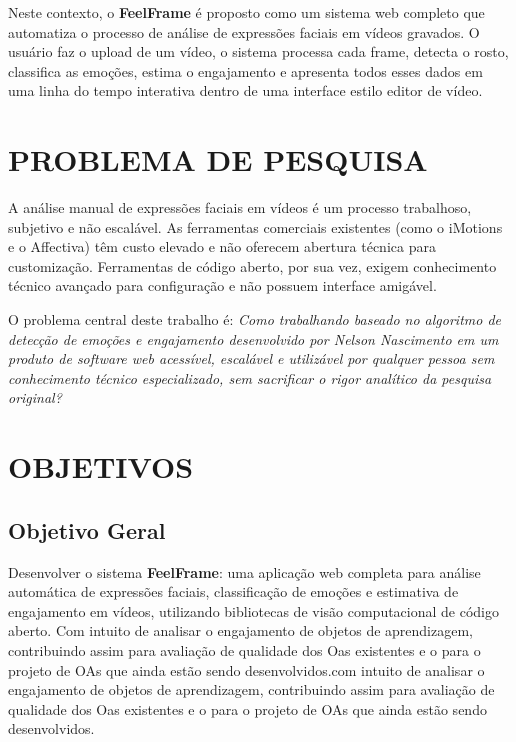 \documentclass[
	12pt,
	openright,
	oneside,
	a4paper,
	english,
	brazil
	]{abntex2}
\begin{document}
Neste contexto, o \textbf{FeelFrame} é proposto como um sistema web completo que automatiza o processo de análise de expressões faciais em vídeos gravados. O usuário faz o upload de um vídeo, o sistema processa cada frame, detecta o rosto, classifica as emoções, estima o engajamento e apresenta todos esses dados em uma linha do tempo interativa dentro de uma interface estilo editor de vídeo.

\section{PROBLEMA DE PESQUISA}

A análise manual de expressões faciais em vídeos é um processo trabalhoso, subjetivo e não escalável. As ferramentas comerciais existentes (como o iMotions e o Affectiva) têm custo elevado e não oferecem abertura técnica para customização. Ferramentas de código aberto, por sua vez, exigem conhecimento técnico avançado para configuração e não possuem interface amigável.

O problema central deste trabalho é: \textit{Como trabalhando baseado no algoritmo de detecção de emoções e engajamento desenvolvido por Nelson Nascimento  \cite{nascimento2024nelson} em um produto de software web acessível, escalável e utilizável por qualquer pessoa sem conhecimento técnico especializado, sem sacrificar o rigor analítico da pesquisa original?}

\section{OBJETIVOS}

\subsection{Objetivo Geral}

Desenvolver o sistema \textbf{FeelFrame}: uma aplicação web completa para análise automática de expressões faciais, classificação de emoções e estimativa de engajamento em vídeos, utilizando bibliotecas de visão computacional de código aberto. Com intuito de analisar o engajamento de objetos de aprendizagem, contribuindo assim para avaliação de qualidade dos Oas existentes e o para o projeto de OAs que ainda estão sendo desenvolvidos.com intuito de analisar o engajamento de objetos de aprendizagem, contribuindo assim para avaliação de qualidade dos Oas existentes e o para o projeto de OAs que ainda estão sendo desenvolvidos.
\end{document}
